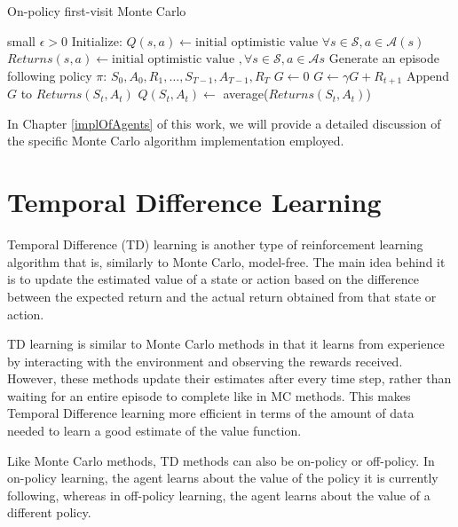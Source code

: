 \begin{algorithm}
\caption{On-policy first-visit Monte Carlo}\label{algo:MC}
\begin{algorithmic}[1]
\Require small $\epsilon >0$
\State Initialize:
\State \hspace{0.5cm} $Q(s,a) \gets \text{initial optimistic value } \forall s\in \mathcal{S}, a\in \mathcal{A}(s)$
\State \hspace{0.5cm} $Returns(s,a) \gets \text{initial optimistic value }, \forall s\in \mathcal{S}, a\in \mathcal{A}{s}$
\Repeat
\State Generate an episode following policy $\pi$: $S_0, A_0, R_1,\dots, S_{T-1}, A_{T-1}, R_T$
\State $G \gets 0$
\State $G \gets \gamma G + R_{t+1}$
\State Append $G$ to $Returns(S_t, A_t)$
\State $Q(S_t, A_t) \gets$ average($Returns(S_t, A_t)$)
\EndIf
\EndFor
{}
\end{algorithmic}
\end{algorithm}

In Chapter \ref{implOfAgents} of this work, we will provide a detailed discussion of the specific Monte Carlo algorithm implementation employed.

\section{Temporal Difference Learning}
Temporal Difference (TD) learning is another type of reinforcement learning algorithm that is, similarly to Monte Carlo, model-free. The main idea behind it is to update the estimated value of a state or action based on the difference between the expected return and the actual return obtained from that state or action. 

TD learning is similar to Monte Carlo methods in that it learns from experience by interacting with the environment and observing the rewards received. However, these methods update their estimates after every time step, rather than waiting for an entire episode to complete like in MC methods. This makes Temporal Difference learning more efficient in terms of the amount of data needed to learn a good estimate of the value function.

Like Monte Carlo methods, TD methods can also be on-policy or off-policy. In on-policy learning, the agent learns about the value of the policy it is currently following, whereas in off-policy learning, the agent learns about the value of a different policy. 

